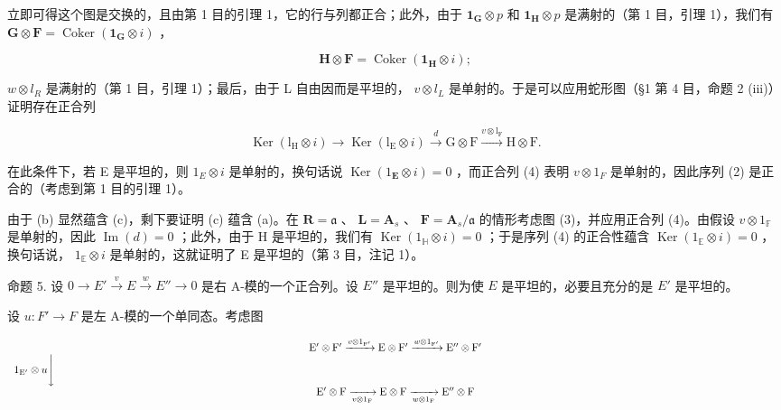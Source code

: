 立即可得这个图是交换的，且由第 1 目的引理 1，它的行与列都正合；此外，由于 \(\mathbf{1}_{\mathbf{G}} \otimes p\) 和 \(\mathbf{1}_{\mathbf{H}} \otimes p\) 是满射的（第 1 目，引理 1），我们有 \(\mathbf{G} \otimes \mathbf{F} = \operatorname{Coker}(\mathbf{1}_{\mathbf{G}} \otimes i)\) ，

\[
\mathbf {H} \otimes \mathbf {F} = \operatorname{Coker} (\mathbf {1} _ {\mathbf {H}} \otimes i);
\]

\(w \otimes l_{R}\) 是满射的（第 1 目，引理 1）；最后，由于 L 自由因而是平坦的， \(v \otimes l_{L}\) 是单射的。于是可以应用蛇形图（§1 第 4 目，命题 2 (iii)）证明存在正合列

\[
\operatorname{Ker} \left(\mathrm{l} _ {\mathrm{H}} \otimes i\right) \longrightarrow \operatorname{Ker} \left(\mathrm{l} _ {\mathrm{E}} \otimes i\right) \xrightarrow {d} \mathrm{G} \otimes \mathrm{F} \xrightarrow {v \otimes \mathrm{l} _ {\mathrm{F}}} \mathrm{H} \otimes \mathrm{F}.\tag{4}
\]

在此条件下，若 E 是平坦的，则 \(1_{E} \otimes i\) 是单射的，换句话说 \(\operatorname{Ker}(1_{\mathbf{E}} \otimes i) = 0\) ，而正合列 (4) 表明 \(v \otimes 1_{F}\) 是单射的，因此序列 (2) 是正合的（考虑到第 1 目的引理 1）。

由于 (b) 显然蕴含 (c)，剩下要证明 (c) 蕴含 (a)。在 \(\mathbf{R} = \mathfrak{a}\) 、 \(\mathbf{L} = \mathbf{A}_s\) 、 \(\mathbf{F} = \mathbf{A}_s / \mathfrak{a}\) 的情形考虑图 (3)，并应用正合列 (4)。由假设 \(v \otimes 1_{\mathbb{F}}\) 是单射的，因此 \(\operatorname{Im}(d) = 0\) ；此外，由于 H 是平坦的，我们有 \(\operatorname{Ker}(1_{\mathbb{H}} \otimes i) = 0\) ；于是序列 (4) 的正合性蕴含 \(\operatorname{Ker}(1_{\mathbb{E}} \otimes i) = 0\) ，换句话说， \(1_{\mathbb{E}} \otimes i\) 是单射的，这就证明了 E 是平坦的（第 3 目，注记 1）。

命题 5. 设 \(0 \to E' \xrightarrow{v} E \xrightarrow{w} E'' \to 0\) 是右 A-模的一个正合列。设 \(E''\) 是平坦的。则为使 \(E\) 是平坦的，必要且充分的是 \(E'\) 是平坦的。

设 \(u: F' \to F\) 是左 A-模的一个单同态。考虑图

\[
\begin{array}{c} \mathrm{E} ^ {\prime} \otimes \mathrm{F} ^ {\prime} \xrightarrow {v \otimes 1 _ {\mathrm{F} ^ {\prime}}} \mathrm{E} \otimes \mathrm{F} ^ {\prime} \xrightarrow {w \otimes 1 _ {\mathrm{F} ^ {\prime}}} \mathrm{E} ^ {\prime \prime} \otimes \mathrm{F} ^ {\prime} \\ 1 _ {\mathrm{E} ^ {\prime}} \otimes u \Bigg \downarrow \qquad \qquad \qquad \qquad \qquad \qquad \qquad \qquad \qquad \qquad \qquad \qquad \qquad \qquad \qquad \qquad \qquad \qquad \qquad \qquad \qquad \qquad \qquad \qquad \qquad \qquad \qquad \qquad \qquad \qquad \qquad \qquad \qquad \qquad \\ \mathrm{E} ^ {\prime} \otimes \mathrm{F} \xrightarrow [ v \otimes 1 _ {\mathrm{F}} ]{} \mathrm{E} \otimes \mathrm{F} \xrightarrow [ w \otimes 1 _ {\mathrm{F}} ]{} \mathrm{E} ^ {\prime \prime} \otimes \mathrm{F} \end{array}
\]

